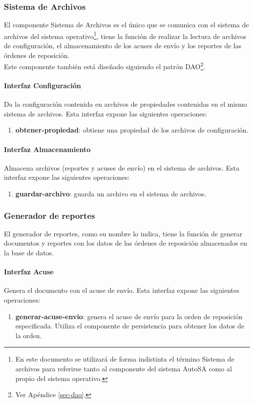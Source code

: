 \subsubsection{Sistema de Archivos}
El componente Sistema de Archivos es el único que se comunica con el sistema de archivos del sistema operativo\footnote{En este documento se utilizará de forma indistinta el término Sistema de archivos para referirse tanto al componente del sistema AutoSA como al propio del sistema operativo.}, tiene la función de realizar la lectura de archivos de configuración, el almacenamiento de los acuses de envío  y los reportes de las órdenes de reposición.\\
Este componente también está diseñado siguiendo el patrón DAO\footnote{Ver Apéndice \ref{sec-dao}.}.
\paragraph{Interfaz Configuración\\}
Da la configuración contenida en archivos de propiedades contenidas en el mismo sistema de archivos. Esta interfaz expone las siguientes operaciones:

\begin{enumerate}
	\item \textbf{obtener-propiedad}: obtiene una propiedad de los archivos de configuración.
\end{enumerate}

\paragraph{Interfaz Almacenamiento\\}
Almacena archivos (reportes y acuses de envío) en el sistema de archivos. Esta interfaz expone las siguientes operaciones:
\begin{enumerate}
	\item \textbf{guardar-archivo}: guarda un archivo en el sistema de archivos.
\end{enumerate}

\subsubsection{Generador de reportes}
El generador de reportes, como su nombre lo indica, tiene la función de generar documentos y reportes con los datos de las órdenes de reposición almacenados en la base de datos. 
\paragraph{Interfaz Acuse\\} Genera el documento con el acuse de envío. Esta interfaz expone las siguientes operaciones:
\begin{enumerate}
	\item \textbf{generar-acuse-envio}: genera el acuse de envío para la orden de reposición especificada. Utiliza el componente de persistencia para obtener los datos de la orden.
\end{enumerate}

